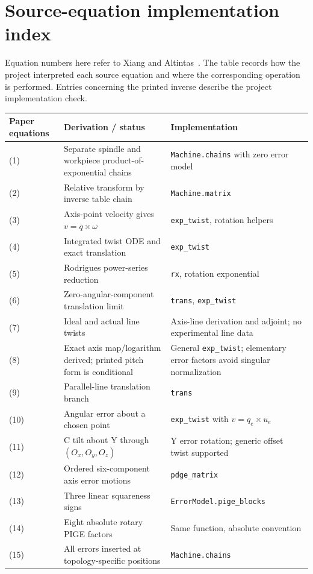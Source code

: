 \clearpage\section{Source-equation implementation index}Equation numbers here refer to Xiang and Altintas~\cite{xiang}. The table records how the project interpreted each source equation and where the corresponding operation is performed. Entries concerning the printed inverse describe the project implementation check.
{\small\begin{longtable}{p{.11\linewidth}p{.42\linewidth}p{.37\linewidth}}
\toprule Paper equations & Derivation / status & Implementation \\\midrule\endhead
(1) & Separate spindle and workpiece product-of-exponential chains & \texttt{Machine.chains} with zero error model \\
(2) & Relative transform by inverse table chain & \texttt{Machine.matrix} \\
(3) & Axis-point velocity gives $v=q\times\omega$ & \texttt{exp\_twist}, rotation helpers \\
(4) & Integrated twist ODE and exact translation & \texttt{exp\_twist} \\
(5) & Rodrigues power-series reduction & \texttt{rx}, rotation exponential \\
(6) & Zero-angular-component translation limit & \texttt{trans}, \texttt{exp\_twist} \\
(7) & Ideal and actual line twists & Axis-line derivation and adjoint; no experimental line data \\
(8) & Exact axis map/logarithm derived; printed pitch form is conditional & General \texttt{exp\_twist}; elementary error factors avoid singular normalization \\
(9) & Parallel-line translation branch & \texttt{trans} \\
(10) & Angular error about a chosen point & \texttt{exp\_twist} with $v=q_e\times u_e$ \\
(11) & C tilt about Y through $(O_x,O_y,O_z)$ & Y error rotation; generic offset twist supported \\
(12) & Ordered six-component axis error motions & \texttt{pdge\_matrix} \\
(13) & Three linear squareness signs & \texttt{ErrorModel.pige\_blocks} \\
(14) & Eight absolute rotary PIGE factors & Same function, absolute convention \\
(15) & All errors inserted at topology-specific positions & \texttt{Machine.chains} \\

\end{longtable}}
